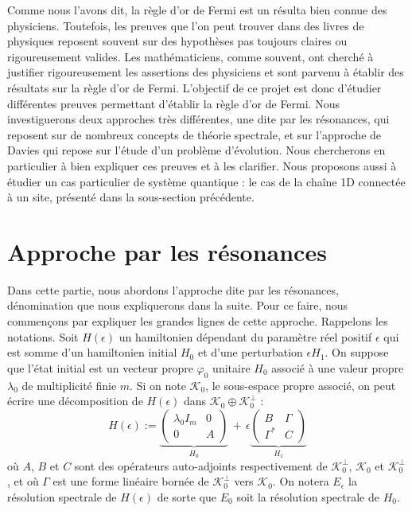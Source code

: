 \documentclass[12pt,openany,a4paper, titlepage]{article}
\newcommand{\vp}{\varphi}
\theoremstyle{definition}
\theoremstyle{definition}
\theoremstyle{definition}
\theoremstyle{definition}
\theoremstyle{definition}
\theoremstyle{definition}
\begin{document}
Comme nous l'avons dit, la règle d'or de Fermi est un résulta bien connue des physiciens. Toutefois, les preuves que l'on peut trouver dans des livres de physiques reposent souvent sur des hypothèses pas toujours claires ou rigoureusement valides. Les mathématiciens, comme souvent, ont cherché à justifier rigoureusement les assertions des physiciens et sont parvenu à établir des résultats sur la règle d'or de Fermi. L'objectif de ce projet est donc d'étudier différentes preuves permettant d'établir la règle d'or de Fermi. Nous investiguerons deux approches très différentes, une dite par les résonances, qui reposent sur de nombreux concepts de théorie spectrale, et sur l'approche de Davies qui repose sur l'étude d'un problème d'évolution. Nous chercherons en particulier à bien expliquer ces preuves et à les clarifier. Nous proposons aussi à étudier un cas particulier de système quantique : le cas de la chaîne 1D connectée à un site, présenté dans la sous-section précédente.


\newpage

\section{Approche par les résonances}

Dans cette partie, nous abordons l'approche dite par les résonances, dénomination que nous expliquerons dans la suite. Pour ce faire, nous commençons par expliquer les grandes lignes de cette approche.
Rappelons les notations. Soit $H(\epsilon)$ un hamiltonien dépendant du paramètre réel positif $\epsilon$ qui est somme d'un hamiltonien initial $H_0$ et d'une perturbation $\epsilon H_1$. On suppose que l'état initial est un vecteur propre $\vp_0$ unitaire $H_0$ associé à une valeur propre $\lambda_0$ de multiplicité finie $m$. Si on note $\mathcal{K}_0$, le sous-espace propre associé, on peut écrire une décomposition de $H(\epsilon)$ dans $\mathcal{K}_0 \oplus \mathcal{K}_0^\perp$ : 
$$H(\epsilon) := 
\underbrace{\begin{pmatrix}
\lambda_0I_m & 0 \\
0    & A 
\end{pmatrix}}_{H_0} \,+\, \epsilon
\underbrace{\begin{pmatrix}
B        & \Gamma \\
\Gamma^* &  C
\end{pmatrix}}_{H_1}$$
où $A$, $B$ et $C$ sont des opérateurs auto-adjoints respectivement de $\mathcal{K}_0^\perp$, $\mathcal{K}_0$ et $\mathcal{K}_0^\perp$, et où $\Gamma$ est une forme linéaire bornée de $\mathcal{K}_0^\perp$ vers $\mathcal{K}_0$.  On notera $E_\epsilon$ la résolution spectrale de $H(\epsilon)$ de sorte que $E_0$ soit la résolution spectrale de $H_0$.
\end{document}
